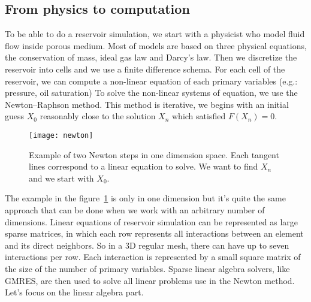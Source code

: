 \subsection{From physics to computation}
To be able to do a reservoir simulation, we start with a physicist who model fluid flow inside porous medium.
%
Most of models are based on three physical equations, the conservation of mass, ideal gas law and Darcy's law.
%
Then we discretize the reservoir into cells and we use a finite difference schema.
%
For each cell of the reservoir, we can compute a non-linear equation of each primary variables (e.g.: pressure, oil saturation)
%
To solve the non-linear systems of equation, we use the Newton–Raphson method.
%
This method is iterative, we begins with an initial guess $X_0$ reasonably close to the solution $X_n$ which satisfied $F(X_n) = 0$.

\begin{figure}[!ht]
  \centering
  \texttt{[image: newton]}
  \caption{Example of two Newton steps in one dimension space.
    Each tangent lines correspond to a linear equation to solve.
    We want to find $X_n$ and we start with $X_0$.}
\label{fig:newton}
\end{figure}

The example in the figure~\ref{fig:newton} is only in one dimension but it's quite the same approach that can be done when we work with an arbitrary number of dimensions.
%
Linear equations of reservoir simulation can be represented as large sparse matrices, in which each row represents all interactions between an element and its direct neighbors.
%
So in a 3D regular mesh, there can have up to seven interactions per row.
%
Each interaction is represented by a small square matrix of the size of the number of primary variables.
%
Sparse linear algebra solvers, like GMRES, are then used to solve all linear problems use in the Newton method.
%
Let's focus on the linear algebra part.
